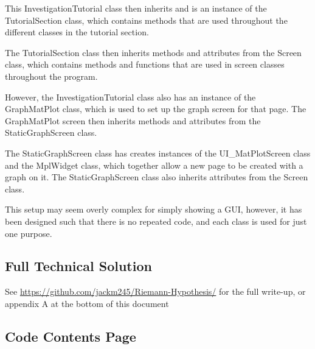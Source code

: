 \documentclass{article}
\begin{document}
This InvestigationTutorial class then inherits and is an instance of the TutorialSection class, which contains methods that are used throughout the different classes in the tutorial section.

The TutorialSection class then inherits methods and attributes from the Screen class, which contains methods and functions that are used in screen classes throughout the program.

However, the InvestigationTutorial class also has an instance of the GraphMatPlot class, which is used to set up the graph screen for that page. The GraphMatPlot screen then inherits methods and attributes from the StaticGraphScreen class.

The StaticGraphScreen class has creates instances of the UI\_MatPlotScreen class and the MplWidget class, which together allow a new page to be created with a graph on it. The StaticGraphScreen class also inherits attributes from the Screen class.

This setup may seem overly complex for simply showing a GUI, however, it has been designed such that there is no repeated code, and each class is used for just one purpose.

\clearpage

\subsection{Full Technical Solution}

See \url{https://github.com/jackm245/Riemann-Hypothesis/} for the full write-up, or appendix A at the bottom of this document

\subsection{Code Contents Page}
\end{document}
